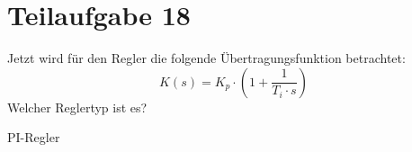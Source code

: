 \section{Teilaufgabe 18}
\begin{aufgabe}
Jetzt wird für den Regler die folgende Übertragungsfunktion betrachtet:
\[ K(s) = K_p \cdot \left(1 + \frac{1}{T_i \cdot s}\right) \]
Welcher Reglertyp ist es?
\end{aufgabe}
PI-Regler
